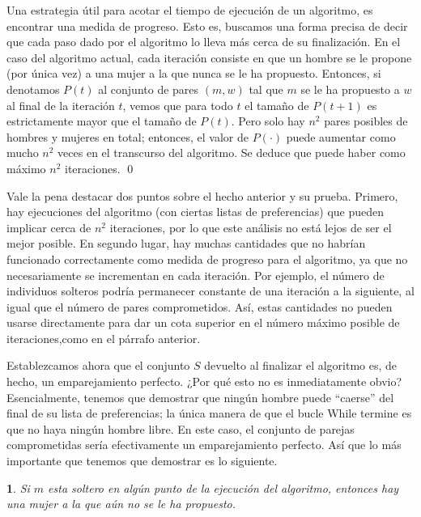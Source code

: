 \documentclass[a4paper, 12pt]{book}
\theoremstyle{dotless}
\newtheorem{theorem}{}%
\renewenvironment{proof}{{\noindent\bfseries Demostración.}}{\qed\vspace{12pt}}
\begin{document}
\vspace{0.2cm}

\begin{proof}
Una estrategia útil para acotar el tiempo de ejecución de un algoritmo, es encontrar una medida de progreso. Esto es, buscamos una forma precisa de decir que cada paso dado por el algoritmo lo lleva más cerca de su finalización. En el caso del algoritmo actual, cada iteración consiste en que un hombre se le propone (por única vez) a una mujer a la que nunca se le ha propuesto. Entonces, si denotamos $P(t)$ al conjunto de pares $(m, w)$ tal que $m$ se le ha propuesto a $w$ al final de la iteración $t$, vemos que para todo $t$ el tamaño de $P(t+1)$ es estrictamente mayor que el tamaño de $P(t)$. Pero solo hay $n^2$ pares posibles de hombres y mujeres en total; entonces, el valor de $P(\cdot)$ puede aumentar como mucho $n^2$ veces en el transcurso del algoritmo. Se deduce que puede haber como máximo $n^2$ iteraciones. 
\end{proof} 

Vale la pena destacar dos puntos sobre el hecho anterior y su prueba. Primero, hay ejecuciones del algoritmo (con ciertas listas de preferencias) que pueden implicar cerca de $n^2$ iteraciones, por lo que este análisis no está lejos de ser el mejor posible.
En segundo lugar, hay muchas cantidades que no habrían funcionado correctamente como medida de progreso para el algoritmo, ya que no necesariamente se incrementan en cada iteración. Por ejemplo, el número de individuos solteros podría permanecer constante de una iteración a la siguiente, al igual que el número de pares comprometidos. Así, estas cantidades no pueden usarse directamente para dar un cota superior en el número máximo posible de iteraciones,como en el párrafo anterior.

Establezcamos ahora que el conjunto $S$ devuelto al finalizar el
algoritmo es, de hecho, un emparejamiento perfecto. ¿Por qué esto no es inmediatamente obvio?
Esencialmente, tenemos que demostrar que ningún hombre puede ``caerse'' del final de su lista de preferencias; la única manera de que el bucle While termine es que no haya ningún hombre libre.
En este caso, el conjunto de parejas comprometidas sería efectivamente un emparejamiento perfecto.
Así que lo más importante que tenemos que demostrar es lo siguiente.

\begin{theorem}
Si $m$ esta soltero en algún punto de la ejecución del algoritmo, entonces hay una mujer a la que aún no se le ha propuesto.
\end{theorem}
\end{document}

